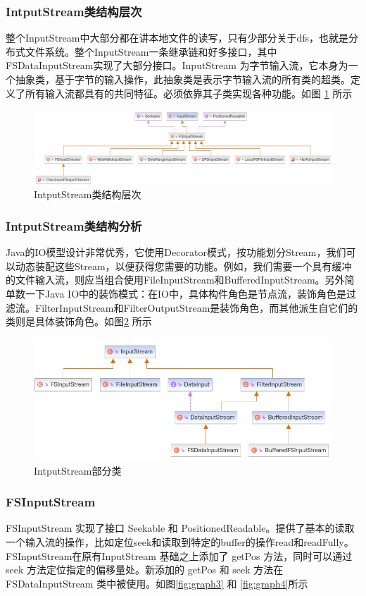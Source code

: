 	\subsubsection{IntputStream类结构层次} 
	整个InputStream中大部分都在讲本地文件的读写，只有少部分关于dfs，也就是分布式文件系统。整个InputStream一条继承链和好多接口，其中FSDataInputStream实现了大部分接口。InputStream 为字节输入流，它本身为一个抽象类，基于字节的输入操作，此抽象类是表示字节输入流的所有类的超类。定义了所有输入流都具有的共同特征。必须依靠其子类实现各种功能。如图 \ref{fig:graph1} 所示
	
	\begin{figure}
		\centering
	    \includegraphics[width=0.7\linewidth]{UML/inputstream/hdfs-common-inputstream-diagram.png}
		\caption{IntputStream类结构层次}
		\label{fig:graph1}
	\end{figure}
	
	\subsubsection{IntputStream类结构分析} 
	Java的IO模型设计非常优秀，它使用Decorator模式，按功能划分Stream，我们可以动态装配这些Stream，以便获得您需要的功能。例如，我们需要一个具有缓冲的文件输入流，则应当组合使用FileInputStream和BufferedInputStream。另外简单数一下Java IO中的装饰模式：在IO中，具体构件角色是节点流，装饰角色是过滤流。FilterInputStream和FilterOutputStream是装饰角色，而其他派生自它们的类则是具体装饰角色。如图\ref{fig:graph2} 所示
	
	\begin{figure}
		\centering
		\includegraphics[width=0.7\linewidth]{UML/inputstream/common-io-diagram.png}
		\caption{IntputStream部分类}
		\label{fig:graph2}
	\end{figure}
	
	\subsubsection{FSInputStream}
	FSInputStream 实现了接口 Seekable 和 PositionedReadable。提供了基本的读取一个输入流的操作，比如定位seek和读取到特定的buffer的操作read和readFully。FSInputStream在原有InputStream 基础之上添加了 getPos 方法，同时可以通过 seek 方法定位指定的偏移量处。新添加的 getPos 和 seek 方法在 FSDataInputStream 类中被使用。如图\ref{fig:graph3} 和 \ref{fig:graph4}所示
	
